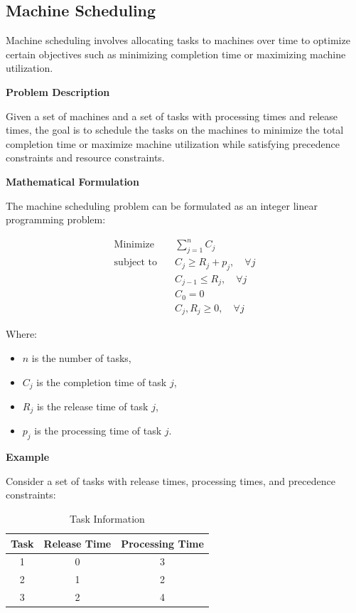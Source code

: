 \documentclass[12pt]{book} %
\begin{document}
\subsection{Machine Scheduling}

Machine scheduling involves allocating tasks to machines over time to optimize certain objectives such as minimizing completion time or maximizing machine utilization.

\textbf{Problem Description}

Given a set of machines and a set of tasks with processing times and release times, the goal is to schedule the tasks on the machines to minimize the total completion time or maximize machine utilization while satisfying precedence constraints and resource constraints.

\textbf{Mathematical Formulation}

The machine scheduling problem can be formulated as an integer linear programming problem:

\[
\begin{aligned}
\text{Minimize} \quad & \sum_{j=1}^{n} C_j \\
\text{subject to} \quad & C_j \geq R_j + p_j, \quad \forall j \\
& C_{j-1} \leq R_j, \quad \forall j \\
& C_0 = 0 \\
& C_j, R_j \geq 0, \quad \forall j
\end{aligned}
\]

Where:
\begin{itemize}
    \item $n$ is the number of tasks,
    \item $C_j$ is the completion time of task $j$,
    \item $R_j$ is the release time of task $j$,
    \item $p_j$ is the processing time of task $j$.
\end{itemize}

\textbf{Example}

Consider a set of tasks with release times, processing times, and precedence constraints:

\begin{table}[H]
    \centering
    \begin{tabular}{|c|c|c|}
    \hline
    Task & Release Time & Processing Time \\
    \hline
    1 & 0 & 3 \\
    2 & 1 & 2 \\
    3 & 2 & 4 \\
    \hline
    \end{tabular}
    \caption{Task Information}
\end{table}
\end{document}
